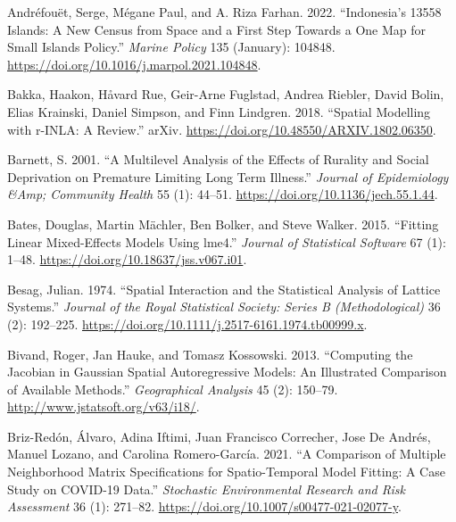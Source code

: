 \hypertarget{refs}{}
\begin{CSLReferences}{1}{0}
\leavevmode{}%
Andréfouët, Serge, Mégane Paul, and A. Riza Farhan. 2022. {``Indonesia's 13558 Islands: A New Census from Space and a First Step Towards a One Map for Small Islands Policy.''} \emph{Marine Policy} 135 (January): 104848. \url{https://doi.org/10.1016/j.marpol.2021.104848}.

\leavevmode{}%
Bakka, Haakon, Håvard Rue, Geir-Arne Fuglstad, Andrea Riebler, David Bolin, Elias Krainski, Daniel Simpson, and Finn Lindgren. 2018. {``Spatial Modelling with r-INLA: A Review.''} arXiv. \url{https://doi.org/10.48550/ARXIV.1802.06350}.

\leavevmode{}%
Barnett, S. 2001. {``A Multilevel Analysis of the Effects of Rurality and Social Deprivation on Premature Limiting Long Term Illness.''} \emph{Journal of Epidemiology \&Amp; Community Health} 55 (1): 44--51. \url{https://doi.org/10.1136/jech.55.1.44}.

\leavevmode{}%
Bates, Douglas, Martin Mächler, Ben Bolker, and Steve Walker. 2015. {``Fitting Linear Mixed-Effects Models Using {lme4}.''} \emph{Journal of Statistical Software} 67 (1): 1--48. \url{https://doi.org/10.18637/jss.v067.i01}.

\leavevmode{}%
Besag, Julian. 1974. {``Spatial Interaction and the Statistical Analysis of Lattice Systems.''} \emph{Journal of the Royal Statistical Society: Series B (Methodological)} 36 (2): 192--225. \url{https://doi.org/10.1111/j.2517-6161.1974.tb00999.x}.

\leavevmode{}%
Bivand, Roger, Jan Hauke, and Tomasz Kossowski. 2013. {``Computing the Jacobian in Gaussian Spatial Autoregressive Models: An Illustrated Comparison of Available Methods.''} \emph{Geographical Analysis} 45 (2): 150--79. \url{http://www.jstatsoft.org/v63/i18/}.

\leavevmode{}%
Briz-Redón, Álvaro, Adina Iftimi, Juan Francisco Correcher, Jose De Andrés, Manuel Lozano, and Carolina Romero-García. 2021. {``A Comparison of Multiple Neighborhood Matrix Specifications for Spatio-Temporal Model Fitting: A Case Study on COVID-19 Data.''} \emph{Stochastic Environmental Research and Risk Assessment} 36 (1): 271--82. \url{https://doi.org/10.1007/s00477-021-02077-y}.


\end{CSLReferences}
